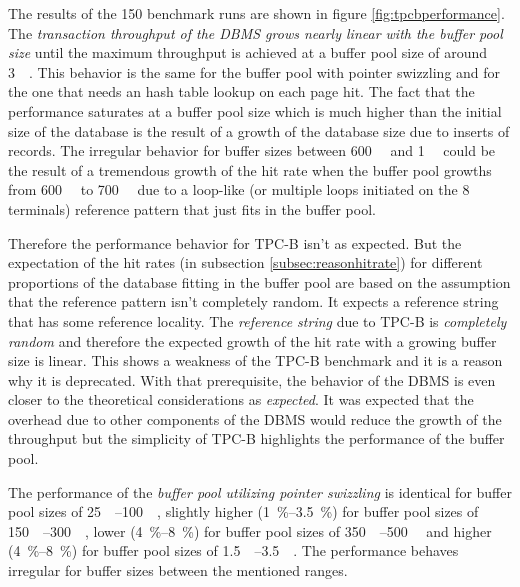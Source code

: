 	The results of the \num{150} benchmark runs are shown in figure \ref{fig:tpcbperformance}. The \emph{transaction throughput of the DBMS grows nearly linear with the buffer pool size} until the maximum throughput is achieved at a buffer pool size of around \SI{3}{\gibi\byte}. This behavior is the same for the buffer pool with pointer swizzling and for the one that needs an hash table lookup on each page hit. The fact that the performance saturates at a buffer pool size which is much higher than the initial size of the database is the result of a growth of the database size due to inserts of records. The irregular behavior for buffer sizes between \SI{600}{\mebi\byte} and \SI{1}{\gibi\byte} could be the result of a tremendous growth of the hit rate when the buffer pool growths from \SI{600}{\mebi\byte} to \SI{700}{\mebi\byte} due to a loop-like (or multiple loops initiated on the 8 terminals) reference pattern that just fits in the buffer pool.
	
	Therefore the performance behavior for TPC-B isn't as expected. But the expectation of the hit rates (in subsection \ref{subsec:reasonhitrate}) for different proportions of the database fitting in the buffer pool are based on the assumption that the reference pattern isn't completely random. It expects a reference string that has some reference locality. The \emph{reference string} due to TPC-B is \emph{completely random} and therefore the expected growth of the hit rate with a growing buffer size is linear. This shows a weakness of the TPC-B benchmark and it is a reason why it is deprecated. With that prerequisite, the behavior of the DBMS is even closer to the theoretical considerations as \emph{expected}. It was expected that the overhead due to other components of the DBMS would reduce the growth of the throughput but the simplicity of TPC-B highlights the performance of the buffer pool.
	
	The performance of the \emph{buffer pool utilizing pointer swizzling} is identical for buffer pool sizes of \SIrange{25}{100}{\mebi\byte}, slightly higher (\SIrange{1}{3.5}{\percent}) for buffer pool sizes of \SIrange{150}{300}{\mebi\byte}, lower (\SIrange{4}{8}{\percent}) for buffer pool sizes of \SIrange{350}{500}{\mebi\byte} and higher (\SIrange{4}{8}{\percent}) for buffer pool sizes of \SIrange{1.5}{3.5}{\gibi\byte}. The performance behaves irregular for buffer sizes between the mentioned ranges.
	
